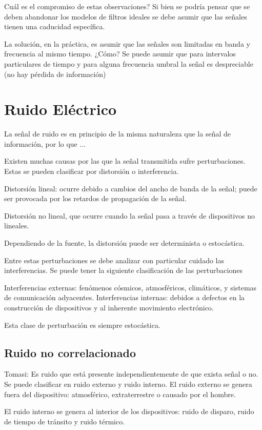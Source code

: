 \documentclass[12pt,letterpaper,titlepage,twoside]{book}
\begin{document}
Cuál es el compromiso de estas observaciones? Si bien se podría pensar que se deben abandonar los modelos de filtros ideales se debe asumir que las señales tienen una caducidad específica.

La solución, en la práctica, es asumir que las señales son limitadas en banda y frecuencia al mismo tiempo. ¿Cómo? Se puede asumir que para intervalos particulares de tiempo  y para alguna frecuencia umbral la señal es despreciable (no hay pérdida de información)

\section{Ruido Eléctrico}
La señal de ruido es en principio de la misma naturaleza que la señal de información, por lo que ...

Existen muchas causas por las que la señal transmitida sufre perturbaciones. Estas se pueden clasificar por distorsión o interferencia.

Distorsión lineal: ocurre debido a cambios del ancho de banda de la señal; puede ser provocada por los retardos de propagación de la señal.

Distorsión no lineal, que ocurre cuando la señal pasa a través de dispositivos no lineales.

Dependiendo de la fuente, la distorsión puede ser determinista o estocástica.

Entre estas perturbaciones se debe analizar con particular cuidado las interferencias.
Se puede tener la siguiente clasificación de las perturbaciones

Interferencias externas: fenómenos cósmicos, atmosféricos, climáticos, y sistemas de comunicación adyacentes.
Interferencias internas: debidos a defectos en la construcción de dispositivos y al inherente movimiento electrónico.

Esta clase de perturbación es siempre estocástica.



\subsection{Ruido no correlacionado}
Tomasi: Es ruido que está presente independientemente de que exista señal o no. Se puede clasificar en ruido externo y ruido interno.
El ruido externo se genera fuera del dispositivo: atmosférico, extraterrestre o causado por el hombre.

El ruido interno se genera al interior de los dispositivos: ruido de disparo, ruido de tiempo de tránsito y ruido térmico.
\end{document}
